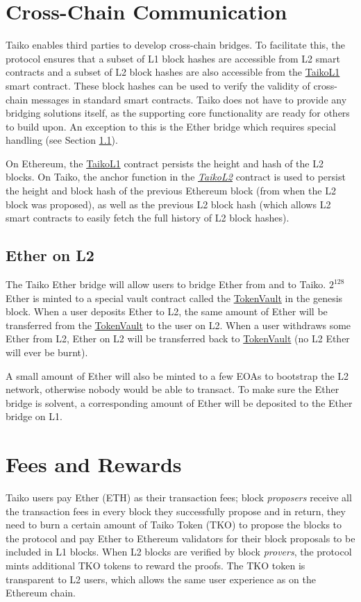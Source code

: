 \documentclass[9pt,oneside]{amsart}
\begin{document}
\begin{multicols}{2}
\section{Cross-Chain Communication}\label{sec:bridges}
Taiko enables third parties to develop cross-chain bridges. To facilitate this, the protocol ensures that a subset of L1 block hashes are accessible from L2 smart contracts and a subset of  L2 block hashes are also accessible from the \underline{TaikoL1} smart contract. These block hashes can be used to verify the validity of cross-chain messages in standard smart contracts. Taiko does not have to provide any bridging solutions itself, as the supporting core functionality are ready for others to build upon. An exception to this is the Ether bridge which requires special handling (see Section \ref{eth-bridge}). 

On Ethereum, the \underline{TaikoL1} contract persists the height and hash of the L2 blocks. On Taiko, the anchor function in the \emph{\underline{TaikoL2}} contract is used to persist the height and block hash of the previous Ethereum block (from when the L2 block was proposed), as well as the previous L2 block hash (which allows L2 smart contracts to easily fetch the full history of L2 block hashes).

\subsection{Ether on L2}
\label{eth-bridge}
The Taiko Ether bridge will allow users to bridge Ether from and to Taiko. $2^{128}$ Ether is minted to a special vault contract called the \underline{TokenVault} in the genesis block. When a user deposits Ether to L2, the same amount of Ether will be transferred from the \underline{TokenVault} to the user on L2. When a user withdraws some Ether from L2, Ether on L2 will be transferred back to \underline{TokenVault} (no L2 Ether will ever be burnt).

A small amount of Ether will also be minted to a few EOAs to bootstrap the L2 network, otherwise nobody would be able to transact. To make sure the Ether bridge is solvent, a corresponding amount of Ether will be deposited to the Ether bridge on L1.

\section{Fees and Rewards}\label{sec:tokenomics}

Taiko users pay Ether (ETH) as their transaction fees; block \emph{proposers} receive all the transaction fees in every block they successfully propose and in return, they need to burn a certain amount of Taiko Token (TKO) to propose the blocks to the protocol and pay Ether to Ethereum validators for their block proposals to be included in L1 blocks. When L2 blocks are verified by block \emph{provers}, the protocol mints additional TKO tokens to reward the proofs. The TKO token is transparent to L2 users, which allows the same user experience as on the Ethereum chain.


\end{multicols}
\end{document}
